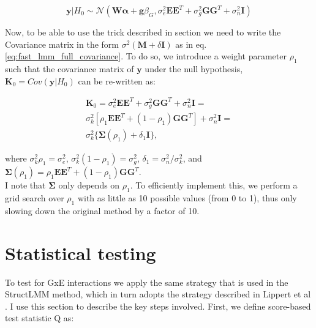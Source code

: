 \begin{equation}\label{eq:scStructLMM_H0_MVN}
 \mathbf{y}|H_0 \sim \mathcal{N}( \mathbf{W}\boldsymbol{\alpha} + \mathbf{g}\beta_G, \sigma_e^2 \mathbf{E}\mathbf{E}^T + \sigma_g^2 \mathbf{G}\mathbf{G}^T+ \sigma_n^2 \mathbf{I} )
\end{equation}

Now, to be able to use the trick described in section 
we need to write the Covariance matrix in the form $\sigma^2(\mathbf{M}+\delta\mathbf{I})$ as in eq. \eqref{eq:fast_lmm_full_covariance}.
To do so, we introduce a weight parameter $\rho_1$ such that the covariance matrix of $\mathbf{y}$ under the null hypothesis, $\mathbf{K}_0 = Cov(\mathbf{y} | H_0)$ can be re-written as:

\begin{equation}
\begin{split}
    \mathbf{K}_0 = \sigma_e^2 \mathbf{E}\mathbf{E}^T + \sigma_g^2 \mathbf{G}\mathbf{G}^T+ \sigma_n^2 \mathbf{I} =\\
    \sigma_k^2[\rho_1\mathbf{E}\mathbf{E}^T + (1-\rho_1) \mathbf{G}\mathbf{G}^T] + \sigma_n^2 \mathbf{I} =\\ \sigma_k^2\{\boldsymbol{\Sigma}(\rho_1) + \delta_1 \mathbf{I}\},
\end{split}
\end{equation}

where $\sigma_k^2\rho_1 = \sigma_e^2$,
$\sigma_k^2(1-\rho_1) = \sigma_g^2$,
$\delta_1 = \sigma_n^2/\sigma_k^2$, and $\boldsymbol{\Sigma}(\rho_1) = \rho_1\mathbf{E}\mathbf{E}^T + (1-\rho_1) \mathbf{G}\mathbf{G}^T$.\\

I note that $\boldsymbol{\Sigma}$ only depends on $\rho_1$. 
To efficiently implement this, we perform a grid search over $\rho_1$ with as little as 10 possible values (from 0 to 1), thus only slowing down the original method by a factor of 10.

\section{Statistical testing}

To test for GxE interactions we apply the same strategy that is used in the StructLMM method, which in turn adopts the strategy described in Lippert et al \cite{lippert2011fast}.
I use this section to describe the key steps involved.
First, we define score-based test statistic Q as:

